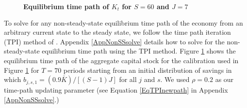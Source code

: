 \documentclass[letterpaper,12pt]{article}
\theoremstyle{definition}
\begin{document}
\begin{spacing}{1.5}
    \begin{figure}[htb]\centering \captionsetup{width=4.0in}
      \caption{\label{FigKpathTPI}\textbf{Equilibrium time path of $K_t$ for $S=60$ and $J=7$}}
    \end{figure}

    To solve for any non-steady-state equilibrium time path of the economy from an arbitrary current state to the steady state, we follow the time path iteration (TPI) method of \citet{AuerbachKotlikoff:1987}. Appendix \ref{AppNonSSsolve} details how to solve for the non-steady-state equilibrium time path using the TPI method. Figure \ref{FigKpathTPI} shows the equilibrium time path of the aggregate capital stock for the calibration used in Figure \ref{FigKpathTPI} for $T=70$ periods starting from an initial distribution of savings in which $b_{j,s,1}=(0.9\bar{K})/[(S-1)J]$ for all $j$ and $s$. We used $\rho=0.2$ as our time-path updating parameter (see Equation \eqref{EqTPInewpath} in Appendix \ref{AppNonSSsolve}.)


\clearpage

\end{spacing}
\end{document}
